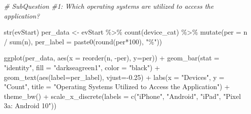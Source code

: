 \documentclass[
]{article}
\newenvironment{Shaded}{\begin{snugshade}}{\end{snugshade}}
\newcommand{\AttributeTok}[1]{\textcolor[rgb]{0.77,0.63,0.00}{#1}}
\newcommand{\CommentTok}[1]{\textcolor[rgb]{0.56,0.35,0.01}{\textit{#1}}}
\newcommand{\DecValTok}[1]{\textcolor[rgb]{0.00,0.00,0.81}{#1}}
\newcommand{\FloatTok}[1]{\textcolor[rgb]{0.00,0.00,0.81}{#1}}
\newcommand{\FunctionTok}[1]{\textcolor[rgb]{0.00,0.00,0.00}{#1}}
\newcommand{\NormalTok}[1]{#1}
\newcommand{\OtherTok}[1]{\textcolor[rgb]{0.56,0.35,0.01}{#1}}
\newcommand{\SpecialCharTok}[1]{\textcolor[rgb]{0.00,0.00,0.00}{#1}}
\newcommand{\StringTok}[1]{\textcolor[rgb]{0.31,0.60,0.02}{#1}}
\begin{document}
\begin{Shaded}
\begin{Highlighting}[]
\CommentTok{\# SubQuestion \#1: Which operating systems are utilized to access the application? }

\FunctionTok{str}\NormalTok{(evStart)}
\NormalTok{per\_data }\OtherTok{\textless{}{-}}\NormalTok{ evStart }\SpecialCharTok{\%\textgreater{}\%}
  \FunctionTok{count}\NormalTok{(device\_cat) }\SpecialCharTok{\%\textgreater{}\%} 
  \FunctionTok{mutate}\NormalTok{(}\AttributeTok{per =}\NormalTok{ n }\SpecialCharTok{/} \FunctionTok{sum}\NormalTok{(n),}
         \AttributeTok{per\_label =} \FunctionTok{paste0}\NormalTok{(}\FunctionTok{round}\NormalTok{(per}\SpecialCharTok{*}\DecValTok{100}\NormalTok{), }\StringTok{"\%"}\NormalTok{))}

\FunctionTok{ggplot}\NormalTok{(per\_data, }\FunctionTok{aes}\NormalTok{(}\AttributeTok{x =} \FunctionTok{reorder}\NormalTok{(n, }\SpecialCharTok{{-}}\NormalTok{per), }\AttributeTok{y=}\NormalTok{per)) }\SpecialCharTok{+} 
  \FunctionTok{geom\_bar}\NormalTok{(}\AttributeTok{stat =} \StringTok{"identity"}\NormalTok{, }\AttributeTok{fill =} \StringTok{"darkseagreen1"}\NormalTok{, }\AttributeTok{color =} \StringTok{"black"}\NormalTok{) }\SpecialCharTok{+} 
  \FunctionTok{geom\_text}\NormalTok{(}\FunctionTok{aes}\NormalTok{(}\AttributeTok{label=}\NormalTok{per\_label), }\AttributeTok{vjust=}\SpecialCharTok{{-}}\FloatTok{0.25}\NormalTok{) }\SpecialCharTok{+} 
  \FunctionTok{labs}\NormalTok{(}\AttributeTok{x =} \StringTok{"Devices"}\NormalTok{, }\AttributeTok{y =} \StringTok{"Count"}\NormalTok{,  }
       \AttributeTok{title =} \StringTok{"Operating Systems Utilized to Access the Application"}\NormalTok{) }\SpecialCharTok{+} 
  \FunctionTok{theme\_bw}\NormalTok{() }\SpecialCharTok{+} 
  \FunctionTok{scale\_x\_discrete}\NormalTok{(}\AttributeTok{labels =} \FunctionTok{c}\NormalTok{(}\StringTok{"iPhone"}\NormalTok{, }\StringTok{"Android"}\NormalTok{, }\StringTok{"iPad"}\NormalTok{, }\StringTok{"Pixel 3a: Android 10"}\NormalTok{))}
\end{Highlighting}
\end{Shaded}
\end{document}
